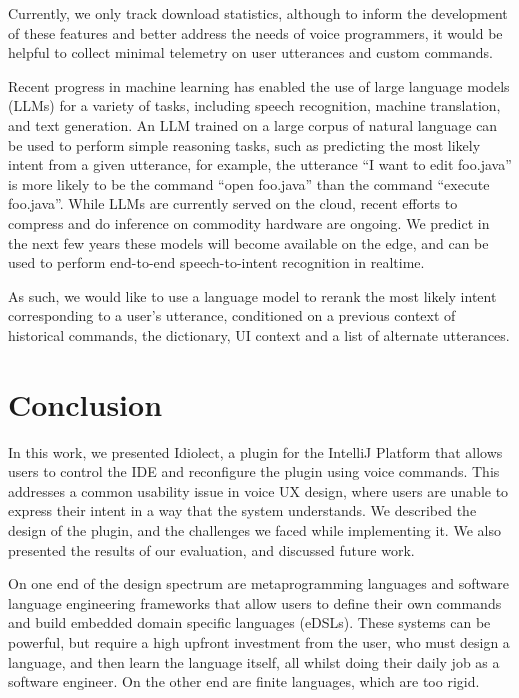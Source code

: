 \documentclass[conference]{IEEEtran}
\begin{document}
Currently, we only track download statistics, although to inform the development of these features and better address the needs of voice programmers, it would be helpful to collect minimal telemetry on user utterances and custom commands.

Recent progress in machine learning has enabled the use of large language models (LLMs) for a variety of tasks, including speech recognition, machine translation, and text generation. An LLM trained on a large corpus of natural language can be used to perform simple reasoning tasks, such as predicting the most likely intent from a given utterance, for example, the utterance ``I want to edit foo.java'' is more likely to be the command ``open foo.java'' than the command ``execute foo.java''. While LLMs are currently served on the cloud, recent efforts to compress and do inference on commodity hardware are ongoing. We predict in the next few years these models will become available on the edge, and can be used to perform end-to-end speech-to-intent recognition in realtime.

As such, we would like to use a language model to rerank the most likely intent corresponding to a user's utterance, conditioned on a previous context of historical commands, the dictionary, UI context and a list of alternate utterances.

\section{Conclusion}

In this work, we presented Idiolect, a plugin for the IntelliJ Platform that allows users to control the IDE and reconfigure the plugin using voice commands. This addresses a common usability issue in voice UX design, where users are unable to express their intent in a way that the system understands. We described the design of the plugin, and the challenges we faced while implementing it. We also presented the results of our evaluation, and discussed future work.

On one end of the design spectrum are metaprogramming languages and software language engineering frameworks that allow users to define their own commands and build embedded domain specific languages (eDSLs). These systems can be powerful, but require a high upfront investment from the user, who must design a language, and then learn the language itself, all whilst doing their daily job as a software engineer. On the other end are finite languages, which are too rigid.
\end{document}
